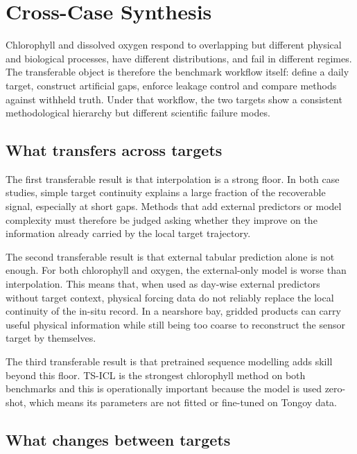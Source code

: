\section{Cross-Case Synthesis}
\label{sec:synthesis}

Chlorophyll and
dissolved oxygen respond to overlapping but different physical and biological processes, have
different distributions, and fail in different regimes. The transferable object is therefore the
benchmark workflow itself: define a daily target, construct artificial gaps, enforce leakage control and
compare methods against withheld truth. Under that workflow, the two targets show a consistent methodological
hierarchy but different scientific failure modes.

\subsection{What transfers across targets}
\label{sec:synthesis_transfers}

The first transferable result is that interpolation is a strong floor. In both case studies, simple
target continuity explains a large fraction of the recoverable signal, especially at short gaps. Methods that add
external predictors or model complexity must therefore be judged asking whether they improve on the information already carried by the local target trajectory.

The second transferable result is that external tabular prediction alone is not enough. For both
chlorophyll and oxygen, the external-only model is worse than interpolation. This means that, when
used as day-wise external predictors without target context, physical forcing data do not reliably replace the
local continuity of the in-situ record. In a nearshore bay, gridded products can carry useful physical
information while still being too coarse to reconstruct the sensor target by themselves.

The third transferable result is that pretrained sequence modelling adds skill beyond this floor.
TS-ICL is the strongest chlorophyll method on both benchmarks and this is operationally important because the model is used
zero-shot, which means its parameters are not fitted or fine-tuned on Tongoy data. 

\subsection{What changes between targets}
\label{sec:synthesis_changes}

